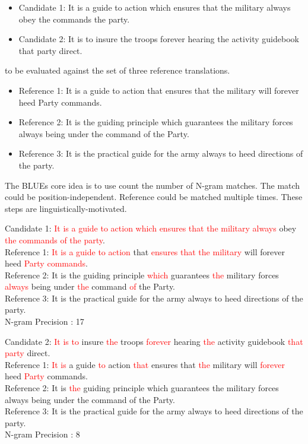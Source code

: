 \documentclass[conference]{IEEEtran}
\begin{document}
\begin{itemize}
\item Candidate 1: It is a guide to action which ensures that the military always obey the commands the party.
\item Candidate 2: It is to insure the troops forever hearing the activity guidebook that party direct.
\end{itemize}

to be evaluated against the set of three reference translations.
\begin{itemize}
\item Reference 1: It is a guide to action that ensures that the military will forever heed Party commands. 
\item Reference 2: It is the guiding principle which guarantees the military forces always being under the command of the Party.
\item Reference 3: It is the practical guide for the army always to heed directions of the party.
\end{itemize}


The BLUEs core idea is to use  count the number of N-gram matches. The match could be position-independent. Reference could be matched multiple times. These steps are linguistically-motivated.





Candidate 1: \textcolor{red} {It is a guide to action which ensures that the military always} obey  \textcolor{red} {the commands of the party}.
\\
Reference 1: \textcolor{red} {It is a guide to action} that \textcolor{red} {ensures that the military} will forever heed \textcolor{red} {Party commands}. 
\\
Reference 2: It is the guiding principle \textcolor{red} {which} guarantees \textcolor{red} {the} military forces \textcolor{red} {always} being under \textcolor{red} {the} command \textcolor{red} {of} the Party.
\\
Reference 3: It is the practical guide for the army always to heed directions of the party.
\\
N-gram Precision : 17


Candidate 2: \textcolor{red} {It is to} insure \textcolor{red} {the} troops \textcolor{red} {forever} hearing \textcolor{red} {the} activity guidebook \textcolor{red} {that party} direct. 
\\
Reference 1: \textcolor{red} {It is} a guide \textcolor{red} {to} action \textcolor{red} {that} ensures that \textcolor{red} {the} military will \textcolor{red} {forever} heed \textcolor{red} {Party} commands. 
\\
Reference 2: It is \textcolor{red} {the} guiding principle which guarantees the military forces always being under the command of the Party.
\\
Reference 3: It is the practical guide for the army always to heed directions of the party.
\\
N-gram Precision : 8
\end{document}
